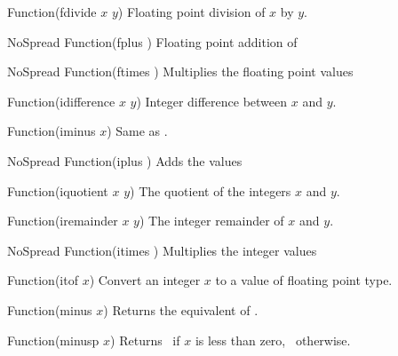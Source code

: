 \begin{defun}{Function}{(fdivide $x$ $y$)}
  Floating point division of $x$ by $y$.
\end{defun}

\begin{defun}{NoSpread Function}{(fplus \xargs)}
  Floating point addition of \largs
\end{defun}

\begin{defun}{NoSpread Function}{(ftimes \xargs)}
  Multiplies the floating point values \largs
\end{defun}

\begin{defun}{Function}{(idifference $x$ $y$)}
  Integer difference between $x$ and $y$.
\end{defun}

\begin{defun}{Function}{(iminus $x$)}
  Same as .
\end{defun}

\begin{defun}{NoSpread Function}{(iplus \xargs)}
  Adds the values \largs
\end{defun}

\begin{defun}{Function}{(iquotient $x$ $y$)}
  The quotient of the integers $x$ and $y$.
\end{defun}

\begin{defun}{Function}{(iremainder $x$ $y$)}
  The integer remainder of $x$ and $y$.
\end{defun}

\begin{defun}{NoSpread Function}{(itimes \xargs)}
  Multiplies the integer values \largs
\end{defun}

\begin{defun}{Function}{(itof $x$)}
  Convert an integer $x$ to a value of floating point type.
\end{defun}

\begin{defun}{Function}{(minus $x$)}
  Returns the equivalent of .
\end{defun}

\begin{defun}{Function}{(minusp $x$)}
  Returns \T\ if $x$ is less than zero, \NIL\ otherwise.
\end{defun}

